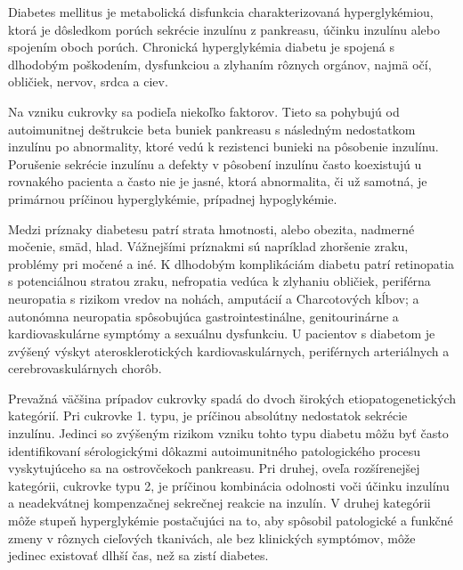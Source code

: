 Diabetes mellitus je metabolická disfunkcia charakterizovaná hyperglykémiou, ktorá je dôsledkom porúch sekrécie inzulínu z pankreasu, účinku inzulínu alebo spojením oboch porúch.\cite{2004}
Chronická hyperglykémia diabetu je spojená s dlhodobým poškodením, dysfunkciou a zlyhaním rôznych orgánov, najmä očí, obličiek, nervov, srdca a ciev.

Na vzniku cukrovky sa podieľa niekoľko faktorov. Tieto sa pohybujú od autoimunitnej deštrukcie beta buniek pankreasu s následným nedostatkom inzulínu po abnormality, ktoré vedú k rezistenci bunieki na pôsobenie inzulínu.
Porušenie sekrécie inzulínu a defekty v pôsobení inzulínu často koexistujú u rovnakého pacienta a často nie je jasné, ktorá abnormalita, či už samotná, je primárnou príčinou hyperglykémie, prípadnej hypoglykémie.\cite{2004}

Medzi príznaky diabetesu patrí strata hmotnosti, alebo obezita, nadmerné močenie, smäd, hlad. Vážnejšími príznakmi sú napríklad zhoršenie zraku, problémy pri močené a iné.
K dlhodobým komplikáciám diabetu patrí retinopatia s potenciálnou stratou zraku, nefropatia vedúca k zlyhaniu obličiek, periférna neuropatia s rizikom vredov na nohách, amputácií a Charcotových kĺbov; a autonómna neuropatia spôsobujúca gastrointestinálne, genitourinárne a kardiovaskulárne symptómy a sexuálnu dysfunkciu. U pacientov s diabetom je zvýšený výskyt aterosklerotických kardiovaskulárnych, periférnych arteriálnych a cerebrovaskulárnych chorôb.\cite{2004}

Prevažná väčšina prípadov cukrovky spadá do dvoch širokých etiopatogenetických kategórií. Pri cukrovke 1. typu, je príčinou absolútny nedostatok sekrécie inzulínu. Jedinci so zvýšeným rizikom vzniku tohto typu diabetu môžu byť často identifikovaní sérologickými dôkazmi autoimunitného patologického procesu vyskytujúceho sa na ostrovčekoch pankreasu. Pri druhej, oveľa rozšírenejšej kategórii, cukrovke typu 2, je príčinou kombinácia odolnosti voči účinku inzulínu a neadekvátnej kompenzačnej sekrečnej reakcie na inzulín. V druhej kategórii môže stupeň hyperglykémie postačujúci na to, aby spôsobil patologické a funkčné zmeny v rôznych cieľových tkanivách, ale bez klinických symptómov, môže jedinec existovať dlhší čas, než sa zistí diabetes.\cite{2004}


